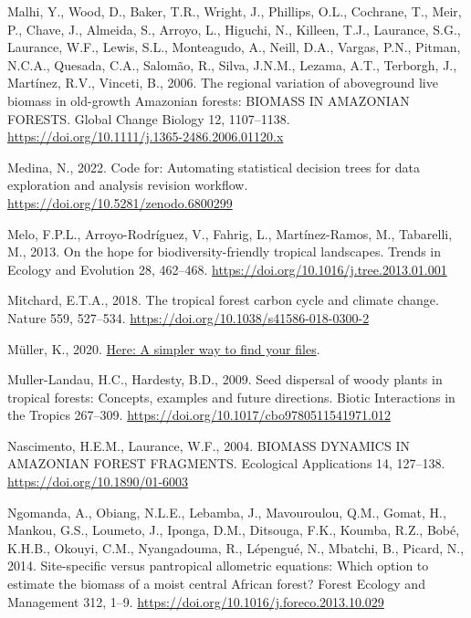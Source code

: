 \documentclass[
  12pt,
]{article}
\newlength{\cslhangindent}
\newlength{\cslentryspacingunit} %
\newenvironment{CSLReferences}[2] %
 {%
  \setlength{\parindent}{0pt}
  \ifodd #1
  \let\oldpar\par
  \def\par{\hangindent=\cslhangindent\oldpar}
  \fi
  \setlength{\parskip}{#2\cslentryspacingunit}
 }%
 {}
\begin{document}
\begin{CSLReferences}{1}{0}
\leavevmode{}%
Malhi, Y., Wood, D., Baker, T.R., Wright, J., Phillips, O.L., Cochrane, T., Meir, P., Chave, J., Almeida, S., Arroyo, L., Higuchi, N., Killeen, T.J., Laurance, S.G., Laurance, W.F., Lewis, S.L., Monteagudo, A., Neill, D.A., Vargas, P.N., Pitman, N.C.A., Quesada, C.A., Salomão, R., Silva, J.N.M., Lezama, A.T., Terborgh, J., Martínez, R.V., Vinceti, B., 2006. The regional variation of aboveground live biomass in old-growth {Amazonian} forests: {BIOMASS IN AMAZONIAN FORESTS}. Global Change Biology 12, 1107--1138. \url{https://doi.org/10.1111/j.1365-2486.2006.01120.x}

\leavevmode{}%
Medina, N., 2022. {Code for: Automating statistical decision trees for data exploration and analysis revision workflow}. \url{https://doi.org/10.5281/zenodo.6800299}

\leavevmode{}%
Melo, F.P.L., Arroyo-Rodríguez, V., Fahrig, L., Martínez-Ramos, M., Tabarelli, M., 2013. On the hope for biodiversity-friendly tropical landscapes. Trends in Ecology and Evolution 28, 462--468. \url{https://doi.org/10.1016/j.tree.2013.01.001}

\leavevmode{}%
Mitchard, E.T.A., 2018. The tropical forest carbon cycle and climate change. Nature 559, 527--534. \url{https://doi.org/10.1038/s41586-018-0300-2}

\leavevmode{}%
Müller, K., 2020. \href{https://CRAN.R-project.org/package=here}{Here: A simpler way to find your files}.

\leavevmode{}%
Muller-Landau, H.C., Hardesty, B.D., 2009. Seed dispersal of woody plants in tropical forests: Concepts, examples and future directions. Biotic Interactions in the Tropics 267--309. \url{https://doi.org/10.1017/cbo9780511541971.012}

\leavevmode{}%
Nascimento, H.E.M., Laurance, W.F., 2004. {BIOMASS DYNAMICS IN AMAZONIAN FOREST FRAGMENTS}. Ecological Applications 14, 127--138. \url{https://doi.org/10.1890/01-6003}

\leavevmode{}%
Ngomanda, A., Obiang, N.L.E., Lebamba, J., Mavouroulou, Q.M., Gomat, H., Mankou, G.S., Loumeto, J., Iponga, D.M., Ditsouga, F.K., Koumba, R.Z., Bobé, K.H.B., Okouyi, C.M., Nyangadouma, R., Lépengué, N., Mbatchi, B., Picard, N., 2014. Site-specific versus pantropical allometric equations: {Which} option to estimate the biomass of a moist central {African} forest? Forest Ecology and Management 312, 1--9. \url{https://doi.org/10.1016/j.foreco.2013.10.029}


\end{CSLReferences}
\end{document}
